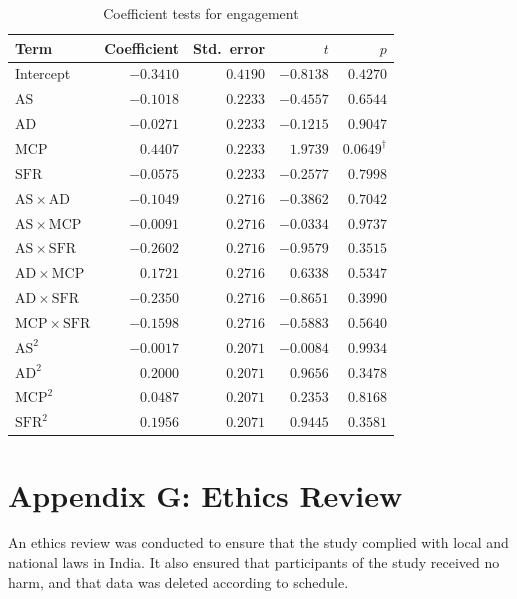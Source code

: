 \documentclass[12pt]{article}
\begin{document}
\begin{table}[htbp]
\centering
\small
\caption{Coefficient tests for engagement}
\label{tab:coef-engagement}
\begin{tabular}{lrrrr}
\toprule
Term & Coefficient & Std.\ error & $t$ & $p$ \\
\midrule
Intercept                         & $-0.3410$ & $0.4190$ & $-0.8138$ & $0.4270$ \\
$\mathrm{AS}$                     & $-0.1018$ & $0.2233$ & $-0.4557$ & $0.6544$ \\
$\mathrm{AD}$                     & $-0.0271$ & $0.2233$ & $-0.1215$ & $0.9047$ \\
$\mathrm{MCP}$                    & $ 0.4407$ & $0.2233$ & $ 1.9739$ & $0.0649^{\dagger}$ \\
$\mathrm{SFR}$                    & $-0.0575$ & $0.2233$ & $-0.2577$ & $0.7998$ \\
$\mathrm{AS}\times\mathrm{AD}$    & $-0.1049$ & $0.2716$ & $-0.3862$ & $0.7042$ \\
$\mathrm{AS}\times\mathrm{MCP}$   & $-0.0091$ & $0.2716$ & $-0.0334$ & $0.9737$ \\
$\mathrm{AS}\times\mathrm{SFR}$   & $-0.2602$ & $0.2716$ & $-0.9579$ & $0.3515$ \\
$\mathrm{AD}\times\mathrm{MCP}$   & $ 0.1721$ & $0.2716$ & $ 0.6338$ & $0.5347$ \\
$\mathrm{AD}\times\mathrm{SFR}$   & $-0.2350$ & $0.2716$ & $-0.8651$ & $0.3990$ \\
$\mathrm{MCP}\times\mathrm{SFR}$  & $-0.1598$ & $0.2716$ & $-0.5883$ & $0.5640$ \\
$\mathrm{AS}^{2}$                 & $-0.0017$ & $0.2071$ & $-0.0084$ & $0.9934$ \\
$\mathrm{AD}^{2}$                 & $ 0.2000$ & $0.2071$ & $ 0.9656$ & $0.3478$ \\
$\mathrm{MCP}^{2}$                & $ 0.0487$ & $0.2071$ & $ 0.2353$ & $0.8168$ \\
$\mathrm{SFR}^{2}$                & $ 0.1956$ & $0.2071$ & $ 0.9445$ & $0.3581$ \\
\bottomrule
\end{tabular}

\medskip

\end{table}

\newpage

\section{Appendix G: Ethics Review}

An ethics review was conducted to ensure that the study complied with local and national laws in India. It also ensured that participants of the study received no harm, and that data was deleted according to schedule.


\newpage



\end{document}
